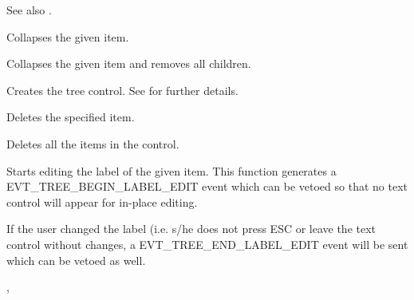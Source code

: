 See also .


\label{wxtreectrlcollapse}


Collapses the given item.

\label{wxtreectrlcollapseandreset}


Collapses the given item and removes all children.

\label{wxtreectrlcreate}


Creates the tree control. See  for further details.

\label{wxtreectrldelete}


Deletes the specified item.

\label{wxtreectrldeleteallitems}


Deletes all the items in the control.

\label{wxtreectrleditlabel}


Starts editing the label of the given item. This function generates a
EVT\_TREE\_BEGIN\_LABEL\_EDIT event which can be vetoed so that no
text control will appear for in-place editing.

If the user changed the label (i.e. s/he does not press ESC or leave
the text control without changes, a EVT\_TREE\_END\_LABEL\_EDIT event
will be sent which can be vetoed as well.


,

